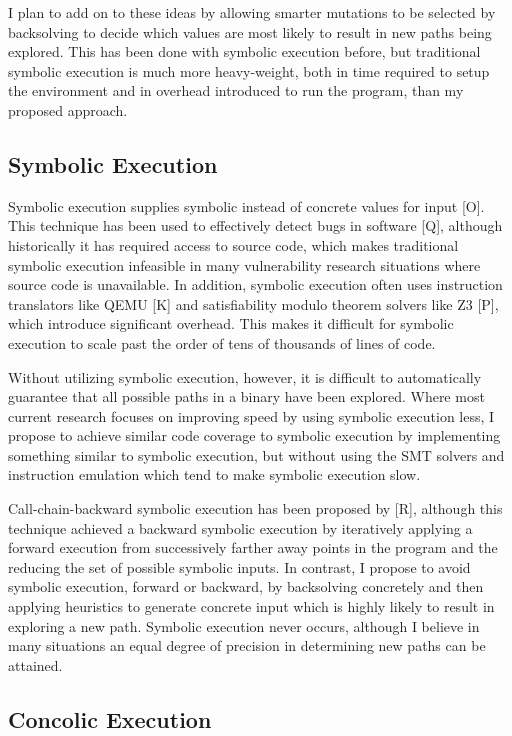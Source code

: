 \documentclass[10pt, twocolumn, times, nocopyrightspace, preprint]{sigplanconf}
\begin{document}
I plan to add on to these ideas by allowing smarter mutations to be selected by backsolving to decide which values are most likely to result in new paths being explored. This has been done with symbolic execution before, but traditional symbolic execution is much more heavy-weight, both in time required to setup the environment and in overhead introduced to run the program, than my proposed approach.

\subsection{Symbolic Execution}

Symbolic execution supplies symbolic instead of concrete values for input [O]. This technique has been used to effectively detect bugs in software [Q], although historically it has required access to source code, which makes traditional symbolic execution infeasible in many vulnerability research situations where source code is unavailable. In addition, symbolic execution often uses instruction translators like QEMU [K] and satisfiability modulo theorem solvers like Z3 [P], which introduce significant overhead. This makes it difficult for symbolic execution to scale past the order of tens of thousands of lines of code. 

Without utilizing symbolic execution, however, it is difficult to automatically guarantee that all possible paths in a binary have been explored. Where most current research focuses on improving speed by using symbolic execution less, I propose to achieve similar code coverage to symbolic execution by implementing something similar to symbolic execution, but without using the SMT solvers and instruction emulation which tend to make symbolic execution slow.

Call-chain-backward symbolic execution has been proposed by [R], although this technique achieved a backward symbolic execution by iteratively applying a forward execution from successively farther away points in the program and the reducing the set of possible symbolic inputs. In contrast, I propose to avoid symbolic execution, forward or backward, by backsolving concretely and then applying heuristics to generate concrete input which is highly likely to result in exploring a new path. Symbolic execution never occurs, although I believe in many situations an equal degree of precision in determining new paths can be attained.

\subsection{Concolic Execution}
\end{document}
